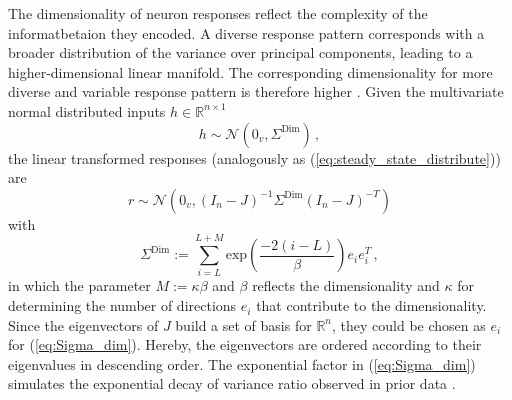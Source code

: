 \documentclass[11pt]{article}
\begin{document}
	The dimensionality of neuron responses reflect the complexity of the informatbetaion they encoded. %
	A diverse response pattern corresponds with a broader distribution of the variance over principal components, leading to a higher-dimensional linear manifold. %
	The corresponding dimensionality for more diverse and variable response pattern is therefore higher \cite{tragenap2023nature}. %
	Given the multivariate normal distributed inputs $h \in \mathbb{R}^{n \times 1}$
		\begin{equation} \label{eq:input_distribution_dimensionality}
			h \sim \mathcal{N}(0_v, \Sigma^{\text{Dim}}) \, ,
		\end{equation}
	the linear transformed responses (analogously as (\ref{eq:steady_state_distribute})) are
		\begin{equation} \label{eq:response_distribution_dimensionality}
			r \sim \mathcal{N}(0_v, (I_n - J)^{-1} \Sigma^{\text{Dim}} (I_n - J)^{-T})
		\end{equation}
	with 
		\begin{equation} \label{eq:Sigma_dim}
			\Sigma^{\text{Dim}} := \sum_{i=L}^{L+M} \text{exp}\left(\frac{-2(i-L)}{\beta}\right) e_i e_i^T \, , 
		\end{equation}
	in which the parameter $M := \kappa \beta$ and $\beta$ reflects the dimensionality \cite{tragenap2023nature} and $\kappa$ for determining the number of directions $e_i$ that contribute to the dimensionality. Since the eigenvectors of $J$ build a set of basis for $\mathbb{R}^n$, they could be chosen as $e_i$ for (\ref{eq:Sigma_dim}). Hereby, the eigenvectors are ordered according to their eigenvalues in descending order. The exponential factor in (\ref{eq:Sigma_dim}) simulates the exponential decay of variance ratio observed in prior data \cite{tragenap2023nature}. 
	
\end{document}
